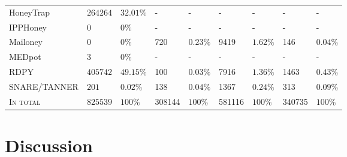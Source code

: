 \begin{table}
\begin{tabularx}{\linewidth}{l|XX|XX|XX|XX}
        HoneyTrap \cite{honeytrap2021}            & $264264$                               & $32.01\%$                                & -                                & -                                  & -               & -             & -               & -             \\
        IPPHoney \cite{ipphoney2021}              & $0$                                    & $0\%$                                    & -                                & -                                  & -               & -             & -               & -             \\
        Mailoney \cite{mailoney2021}              & $0$                                    & $0\%$                                    & 720                              & $0.23\%$                           & 9419            & $1.62\%$      & 146             & $0.04\%$      \\
        MEDpot \cite{medpot2021}                  & $3$                                    & $0\%$                                    & -                                & -                                  & -               & -             & -               & -             \\
        RDPY \cite{rdpy2021}                      & $405742$                               & $49.15\%$                                & 100                              & $0.03\%$                           & 7916            & $1.36\%$      & 1463            & $0.43\%$      \\
        SNARE/TANNER \cite{snare2021}             & $201$                                  & $0.02\%$                                 & 138                              & $0.04\%$                           & 1367            & $0.24\%$      & 313             & $0.09\%$      \\
        \hline
        \textsc{In total}                         & $825539$                               & $100\%$                                  & 308144                           & $100\%$                            & 581116          & $100\%$       & 340735          & $100\%$       \\
        \bottomrule
    \end{tabularx}
    \label{tab:overview-honeypots-attacks}
\end{table}

\section{Discussion}

